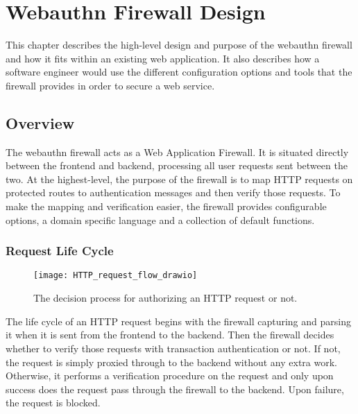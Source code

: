 \chapter{Webauthn Firewall Design}\label{Chap:WebauthnFirewallDesign}

This chapter describes the high-level design and purpose of the webauthn firewall and how it fits within an existing web application. It also describes how a software engineer would use the different configuration options and tools that the firewall provides in order to secure a web service.

\section{Overview}

The webauthn firewall acts as a Web Application Firewall. It is situated directly between the frontend and backend, processing all user requests sent between the two. At the highest-level, the purpose of the firewall is to map HTTP requests on protected routes to authentication messages and then verify those requests. To make the mapping and verification easier, the firewall provides configurable options, a domain specific language and a collection of default functions.

\subsection{Request Life Cycle}

\begin{figure}[h]
  \centering
  \texttt{[image: HTTP\_request\_flow\_drawio]}
  \caption{The decision process for authorizing an HTTP request or not.}  
  \label{fig:xray}
\end{figure}

The life cycle of an HTTP request begins with the firewall capturing and parsing it when it is sent from the frontend to the backend. Then the firewall decides whether to verify those requests with transaction authentication or not. If not, the request is simply proxied through to the backend without any extra work. Otherwise, it performs a verification procedure on the request and only upon success does the request pass through the firewall to the backend. Upon failure, the request is blocked.

